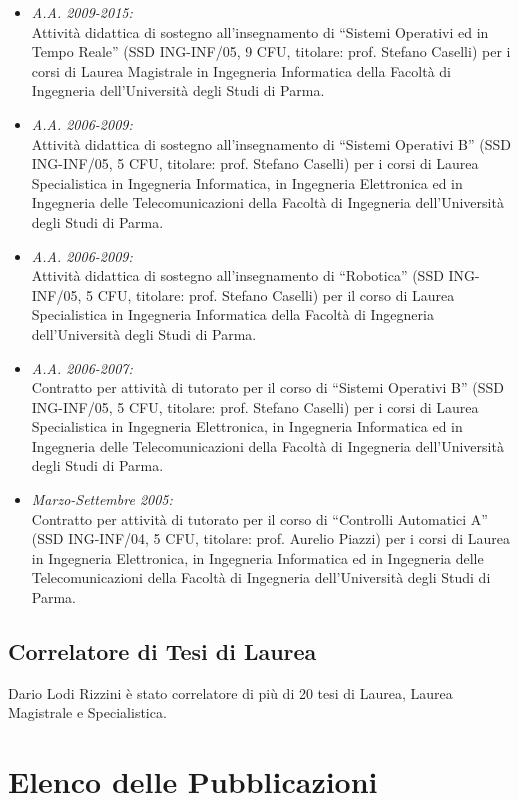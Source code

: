 \documentclass[11pt]{article}
\newcommand{\ITEMDATE}[1]{\item \textit{#1:}\\}
\begin{document}
\begin{itemize}

\ITEMDATE{A.A. 2009-2015} 
Attivit\`a didattica di sostegno all'insegnamento di ``Sistemi Operativi ed in Tempo Reale'' 
(SSD ING-INF/05, 9 CFU, titolare: prof. Stefano Caselli)
per i corsi di Laurea Magistrale in Ingegneria Informatica
della Facolt\`a di Ingegneria dell'Universit\`a degli Studi di Parma.

\ITEMDATE{A.A. 2006-2009} 
Attivit\`a didattica di sostegno all'insegnamento di ``Sistemi Operativi B'' (SSD ING-INF/05, 5 CFU, titolare: prof. Stefano Caselli)
per i corsi di Laurea Specialistica in Ingegneria Informatica, in Ingegneria Elettronica ed in Ingegneria delle Telecomunicazioni
della Facolt\`a di Ingegneria dell'Universit\`a degli Studi di Parma.

\ITEMDATE{A.A. 2006-2009} 
Attivit\`a didattica di sostegno all'insegnamento di ``Robotica'' (SSD ING-INF/05, 5 CFU, titolare: prof. Stefano Caselli)
per il corso di Laurea Specialistica in Ingegneria Informatica 
della Facolt\`a di Ingegneria dell'Universit\`a degli Studi di Parma.

\ITEMDATE{A.A. 2006-2007} 
Contratto per attivit\`a di tutorato per il corso di ``Sistemi Operativi B'' (SSD ING-INF/05, 5 CFU, titolare: prof. Stefano Caselli)
per i corsi di Laurea Specialistica in Ingegneria Elettronica, in Ingegneria Informatica ed in Ingegneria delle Telecomunicazioni 
della Facolt\`a di Ingegneria dell'Universit\`a degli Studi di Parma.

\ITEMDATE{Marzo-Settembre 2005}
Contratto per attivit\`a di tutorato per il corso di ``Controlli Automatici A'' (SSD ING-INF/04, 5 CFU, titolare: prof. Aurelio Piazzi) 
per i corsi di Laurea in Ingegneria Elettronica, in Ingegneria Informatica ed in Ingegneria delle Telecomunicazioni 
della Facolt\`a di Ingegneria dell'Universit\`a degli Studi di Parma. 
\end{itemize}

\subsection*{Correlatore di Tesi di Laurea}

Dario Lodi Rizzini \`e stato correlatore di pi\`u di 20 tesi di Laurea, Laurea Magistrale e Specialistica.


\section{Elenco delle Pubblicazioni}
\end{document}
